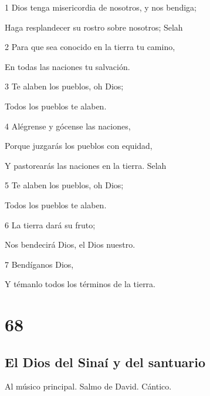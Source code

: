 \par 1 Dios tenga misericordia de nosotros, y nos bendiga;
\par Haga resplandecer su rostro sobre nosotros; Selah
\par 2 Para que sea conocido en la tierra tu camino,
\par En todas las naciones tu salvación.
\par 3 Te alaben los pueblos, oh Dios;
\par Todos los pueblos te alaben.
\par 4 Alégrense y gócense las naciones,
\par Porque juzgarás los pueblos con equidad,
\par Y pastorearás las naciones en la tierra. Selah
\par 5 Te alaben los pueblos, oh Dios;
\par Todos los pueblos te alaben.
\par 6 La tierra dará su fruto;
\par Nos bendecirá Dios, el Dios nuestro.
\par 7 Bendíganos Dios,
\par Y témanlo todos los términos de la tierra.

\chapter{68}

\section*{El Dios del Sinaí y del santuario}

\par Al músico principal. Salmo de David. Cántico.

